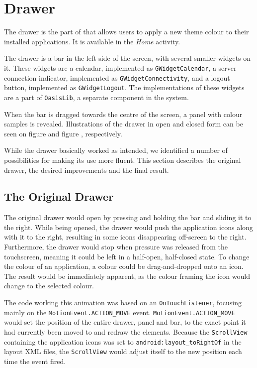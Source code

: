 \section{Drawer}
The drawer is the part of \launcher that allows users to apply a new theme colour to their installed \giraf applications.
It is available in the \textit{Home} activity.

The drawer is a bar in the left side of the screen, with several smaller widgets on it.
These widgets are a calendar, implemented as \lstinline{GWidgetCalendar}, a server connection indicator, implemented as \lstinline{GWidgetConnectivity}, and a logout button, implemented as \lstinline{GWidgetLogout}.
The implementations of these widgets are a part of \lstinline{OasisLib}, a separate component in the \giraf system.

When the bar is dragged towards the centre of the screen, a panel with colour samples is revealed.
Illustrations of the drawer in open and closed form can be seen on figure  and figure , respectively.

While the drawer basically worked as intended, we identified a number of possibilities for making its use more fluent.
This section describes the original drawer, the desired improvements and the final result.

\subsection{The Original Drawer}

The original drawer would open by pressing and holding the bar and sliding it to the right.
While being opened, the drawer would push the application icons along with it to the right, resulting in some icons disappearing off-screen to the right.
Furthermore, the drawer would stop when pressure was released from the touchscreen, meaning it could be left in a half-open, half-closed state.
To change the colour of an application, a colour could be drag-and-dropped onto an icon. The result would be immediately apparent, as the colour framing the icon would change to the selected colour.

The code working this animation was based on an \lstinline{OnTouchListener}, focusing mainly on the \lstinline{MotionEvent.ACTION_MOVE} event.
\lstinline{MotionEvent.ACTION_MOVE} would set the position of the entire drawer, panel and bar, to the exact point it had currently been moved to and redraw the elements.
Because the \lstinline{ScrollView} containing the application icons was set to \lstinline{android:layout_toRightOf} in the layout XML files, the \lstinline{ScrollView} would adjust itself to the new position each time the event fired.

